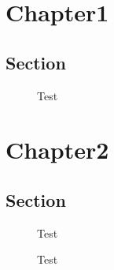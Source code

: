 \documentclass[12pt]{report}
\begin{document}
\listoffigures
\chapter{Chapter1}
\section{Section}
\begin{figure}
\caption{Test}
\end{figure}
\chapter{Chapter2}
\section{Section}
\begin{figure}
\caption{Test}
\end{figure}
\begin{figure}
\caption{Test}
\end{figure}
\end{document}
